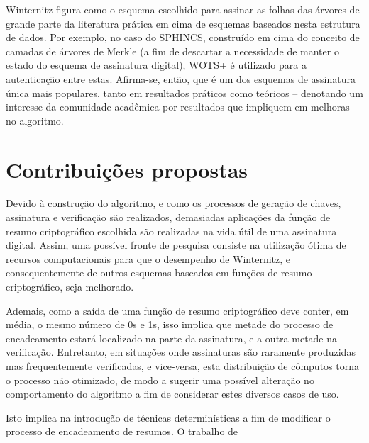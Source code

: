 \documentclass{article}
\begin{document}
Winternitz figura como o esquema escolhido para assinar as folhas das
árvores de grande parte da literatura prática em cima de esquemas baseados
nesta estrutura de dados. Por exemplo, no caso do SPHINCS, construído em
cima do conceito de camadas de árvores de Merkle (a fim de descartar a
necessidade de manter o estado do esquema de assinatura digital), WOTS+ é
utilizado para a autenticação entre estas. Afirma-se, então, que é um
dos esquemas de assinatura única mais populares, tanto em resultados
práticos como teóricos -- denotando um interesse da comunidade acadêmica
por resultados que impliquem em melhoras no algoritmo.

\section{Contribuições propostas}

Devido à construção do algoritmo, e como os processos de geração de chaves,
assinatura e verificação são realizados, demasiadas aplicações da função
de resumo criptográfico escolhida são realizadas na vida útil de uma
assinatura digital. Assim, uma possível fronte de pesquisa consiste na
utilização ótima de recursos computacionais para que o desempenho de
Winternitz, e consequentemente de outros esquemas baseados em funções de
resumo criptográfico, seja melhorado.

Ademais, como a saída de uma função de resumo criptográfico deve conter,
em média, o mesmo número de 0s e 1s, isso implica que metade do processo
de encadeamento estará localizado na parte da assinatura, e a outra
metade na verificação. Entretanto, em situações onde assinaturas são
raramente produzidas mas frequentemente verificadas, e vice-versa, esta
distribuição de cômputos torna o processo não otimizado, de modo a
sugerir uma possível alteração no comportamento do algoritmo a fim de
considerar estes diversos casos de uso.

Isto implica na introdução de técnicas determinísticas a fim de
modificar o processo de encadeamento de resumos. O trabalho de
\cite{Steinwandt:2008:OSU:1412758.1412979} 



\end{document}
